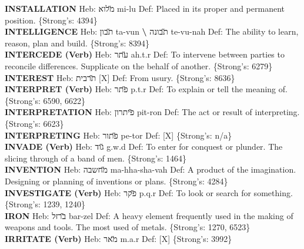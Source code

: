 {\textbf{INSTALLATION} Heb: {\large\H מלוא} mi-lu Def: Placed in its proper and permanent position. \{Strong's: 4394\}\hfill{}\\

\textbf{INTELLIGENCE} Heb: {\large\H תבון} ta-vun \textbf{\textbackslash{}} {\large\H תבונה} te-vu-nah Def: The ability to learn, reason, plan and build. \{Strong's: 8394\}\hfill{}\\

\textbf{INTERCEDE (Verb)} Heb: {\large\H עתר} ah.t.r Def: To intervene between parties to reconcile differences. Supplicate on the behalf of another. \{Strong's: 6279\}\hfill{}\\

\textbf{INTEREST} Heb: {\large\H תרבית} {[}X{]} Def: From usury. \{Strong's: 8636\}\hfill{}\\

\textbf{INTERPRET (Verb)} Heb: {\large\H פתר} p.t.r Def: To explain or tell the meaning of. \{Strong's: 6590, 6622\}\hfill{}\\

\textbf{INTERPRETATION} Heb: {\large\H פיתרון} pit-ron Def: The act or result of interpreting. \{Strong's: 6623\}\hfill{}\\

\textbf{INTERPRETING} Heb: {\large\H פתור} pe-tor Def: {[}X{]} \{Strong's: n/a\}\hfill{}\\

\textbf{INVADE (Verb)} Heb: {\large\H גוד} g.w.d Def: To enter for conquest or plunder. The slicing through of a band of men. \{Strong's: 1464\}\hfill{}\\

\textbf{INVENTION} Heb: {\large\H מחשבה} ma-hha-sha-vah Def: A product of the imagination. Designing or planning of inventions or plans. \{Strong's: 4284\}\hfill{}\\

\textbf{INVESTIGATE (Verb)} Heb: {\large\H פקר} p.q.r Def: To look or search for something. \{Strong's: 1239, 1240\}\hfill{}\\

\textbf{IRON} Heb: {\large\H ברזל} bar-zel Def: A heavy element frequently used in the making of weapons and tools. The most used of metals. \{Strong's: 1270, 6523\}\hfill{}\\

\textbf{IRRITATE (Verb)} Heb: {\large\H מאר} m.a.r Def: {[}X{]} \{Strong's: 3992\}\hfill{}\\

}
